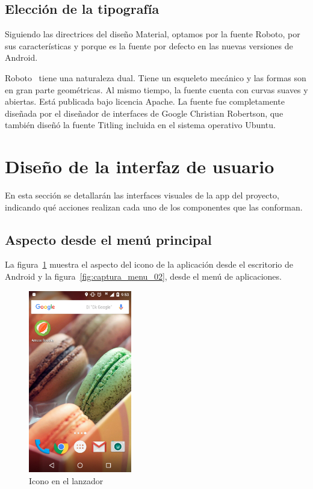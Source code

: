 \subsection{Elección de la tipografía}

Siguiendo las directrices del diseño Material, optamos por la fuente Roboto,
por sus características y porque es la fuente por defecto en las nuevas versiones
de Android.

Roboto~\cite{roboto-font} tiene una naturaleza dual. Tiene un esqueleto mecánico y
las formas son en gran parte geométricas. Al mismo tiempo, la fuente cuenta con
curvas suaves y abiertas. Está publicada bajo licencia Apache. La fuente fue
completamente diseñada por el diseñador de interfaces de Google Christian
Robertson, que también diseñó la fuente Titling incluida en el sistema operativo
Ubuntu. 


\section{Diseño de la interfaz de usuario}

En esta sección se detallarán las interfaces visuales de la app del proyecto,
indicando qué acciones realizan cada uno de los componentes que las conforman.

\subsection{Aspecto desde el menú principal}

La figura~\ref{fig:captura_menu_01} muestra el aspecto del icono de la
aplicación desde el escritorio de Android y la figura~\ref{fig:captura_menu_02},
desde el menú de aplicaciones.

\begin{figure}[htbp]
  \centering
  \includegraphics[width=0.4\textwidth]{cap5/img/captura_menu_01}
  \caption{Icono en el lanzador}
  \label{fig:captura_menu_01}
\end{figure}

